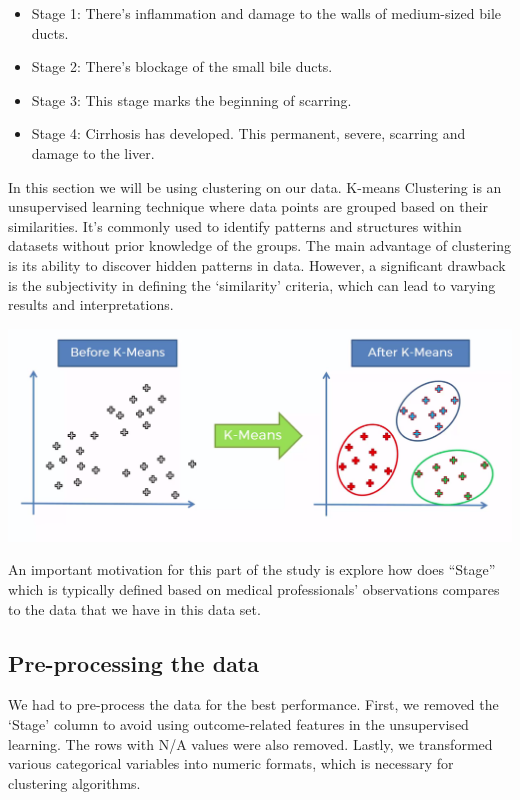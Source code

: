 \documentclass[
]{article}
\begin{document}
\begin{itemize}
\item
  Stage 1: There's inflammation and damage to the walls of medium-sized
  bile ducts.
\item
  Stage 2: There's blockage of the small bile ducts.
\item
  Stage 3: This stage marks the beginning of scarring.
\item
  Stage 4: Cirrhosis has developed. This permanent, severe, scarring and
  damage to the liver.
\end{itemize}

In this section we will be using clustering on our data. K-means
Clustering is an unsupervised learning technique where data points are
grouped based on their similarities. It's commonly used to identify
patterns and structures within datasets without prior knowledge of the
groups. The main advantage of clustering is its ability to discover
hidden patterns in data. However, a significant drawback is the
subjectivity in defining the `similarity' criteria, which can lead to
varying results and interpretations.

\href{https://medium.datadriveninvestor.com/k-means-clustering-4a700d4a4720}{\includegraphics{1*fz-rjYPPRlGEMdTI-RLbDg.png}}

An important motivation for this part of the study is explore how does
``Stage'' which is typically defined based on medical professionals'
observations compares to the data that we have in this data set.

\hypertarget{pre-processing-the-data-1}{%
\subsection{Pre-processing the data}\label{pre-processing-the-data-1}}

We had to pre-process the data for the best performance. First, we
removed the `Stage' column to avoid using outcome-related features in
the unsupervised learning. The rows with N/A values were also removed.
Lastly, we transformed various categorical variables into numeric
formats, which is necessary for clustering algorithms.
\end{document}
